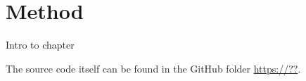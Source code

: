 \chapter{Method}
\label{chap:method}
Intro to chapter 


The source code itself can be found in the GitHub folder \url{https://??}.
